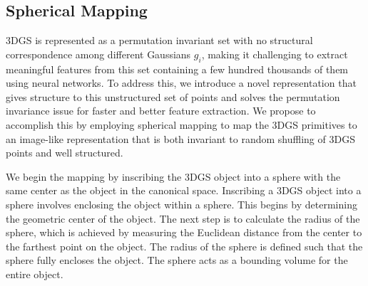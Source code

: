 \subsection{Spherical Mapping}
3DGS is represented as a permutation invariant set with no structural correspondence among different Gaussians $g_i$, making it challenging to extract meaningful features from this set containing a few hundred thousands of them using neural networks. 
To address this, we introduce a novel representation that gives structure to this unstructured set of points and solves the permutation invariance issue for faster and better feature extraction. We propose to accomplish this by employing spherical mapping to map the 3DGS primitives to an image-like representation that is both invariant to random shuffling of 3DGS points and well structured. %



We begin the mapping 
by inscribing the 3DGS object into a sphere with the same center as the object in the canonical space.
Inscribing a 3DGS object into a sphere involves enclosing the object within a sphere. This begins by determining the geometric center of the object. The next step is to calculate the radius of the sphere, which is achieved by measuring the Euclidean distance from the center to the farthest point on the object. The radius of the sphere is defined such that the sphere fully encloses the object. The sphere acts as a bounding volume for the entire object.

